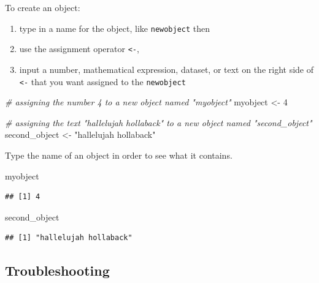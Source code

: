 \documentclass[
]{book}
\newenvironment{Shaded}{\begin{snugshade}}{\end{snugshade}}
\newcommand{\CommentTok}[1]{\textcolor[rgb]{0.56,0.35,0.01}{\textit{#1}}}
\newcommand{\DecValTok}[1]{\textcolor[rgb]{0.00,0.00,0.81}{#1}}
\newcommand{\NormalTok}[1]{#1}
\newcommand{\OtherTok}[1]{\textcolor[rgb]{0.56,0.35,0.01}{#1}}
\newcommand{\StringTok}[1]{\textcolor[rgb]{0.31,0.60,0.02}{#1}}
\providecommand{\tightlist}{%
  \setlength{\itemsep}{0pt}\setlength{\parskip}{0pt}}
\begin{document}
To create an object:

\begin{enumerate}
\def\labelenumi{\arabic{enumi}.}
\tightlist
\item
  type in a name for the object, like \texttt{newobject} then
\item
  use the assignment operator \texttt{\textless{}-},
\item
  input a number, mathematical expression, dataset, or text on the right side of \texttt{\textless{}-} that you want assigned to the \texttt{newobject}
\end{enumerate}

\begin{Shaded}
\begin{Highlighting}[]
\CommentTok{\# assigning the number 4 to a new object named "myobject"}
\NormalTok{myobject }\OtherTok{\textless{}{-}} \DecValTok{4}

\CommentTok{\# assigning the text "hallelujah hollaback" to a new object named "second\_object"}
\NormalTok{second\_object }\OtherTok{\textless{}{-}} \StringTok{"hallelujah hollaback"}
\end{Highlighting}
\end{Shaded}

Type the name of an object in order to see what it contains.

\begin{Shaded}
\begin{Highlighting}[]
\NormalTok{myobject}
\end{Highlighting}
\end{Shaded}

\begin{verbatim}
## [1] 4
\end{verbatim}

\begin{Shaded}
\begin{Highlighting}[]
\NormalTok{second\_object}
\end{Highlighting}
\end{Shaded}

\begin{verbatim}
## [1] "hallelujah hollaback"
\end{verbatim}

\hypertarget{troubleshooting-1}{%
\subsection{Troubleshooting}\label{troubleshooting-1}}
\end{document}
